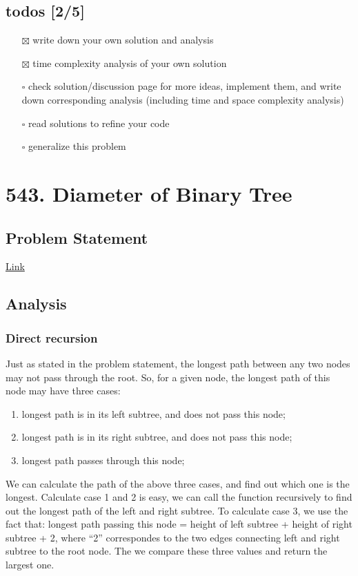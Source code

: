 \documentclass[11pt]{article}
\begin{document}
\subsection{todos [2/5]}
\label{sec:orgb5e0b78}
\begin{itemize}
\item[{$\boxtimes$}] write down your own solution and analysis
\item[{$\boxtimes$}] time complexity analysis of your own solution
\item[{$\square$}] check solution/discussion page for more ideas, implement them, and write down corresponding analysis (including time and space complexity analysis)
\item[{$\square$}] read solutions to refine your code
\item[{$\square$}] generalize this problem
\end{itemize}
\section{543. Diameter of Binary Tree}
\label{sec:org6d91351}
\subsection{Problem Statement}
\label{sec:org4f58718}
\href{https://leetcode.com/problems/diameter-of-binary-tree/}{Link}
\subsection{Analysis}
\label{sec:org819b9fd}
\subsubsection{Direct recursion}
\label{sec:org2ffc9be}
Just as stated in the problem statement, the longest path between any two nodes may not pass through the root. So, for a given node, the longest path of this node may have three cases:
\begin{enumerate}
\item longest path is in its left subtree, and does not pass this node;
\item longest path is in its right subtree, and does not pass this node;
\item longest path passes through this node;
\end{enumerate}

We can calculate the path of the above three cases, and find out which one is the longest. Calculate case 1 and 2 is easy, we can call the function recursively to find out the longest path of the left and right subtree. To calculate case 3, we use the fact that: longest path passing this node = height of left subtree + height of right subtree + 2, where ``2'' correspondes to the two edges connecting left and right subtree to the root node. The we compare these three values and return the largest one.
\end{document}
